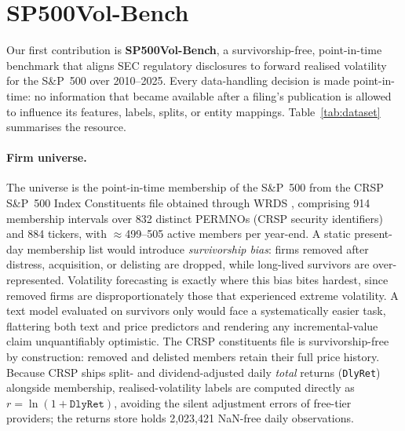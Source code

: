 \section{SP500Vol-Bench}
\label{sec:dataset}

Our first contribution is \textbf{SP500Vol-Bench}, a survivorship-free, point-in-time benchmark that aligns SEC regulatory disclosures to forward realised volatility for the S\&P~500 over 2010--2025. Every data-handling decision is made point-in-time: no information that became available after a filing's publication is allowed to influence its features, labels, splits, or entity mappings. Table~\ref{tab:dataset} summarises the resource.

\paragraph{Firm universe.}
The universe is the point-in-time membership of the S\&P~500 from the CRSP S\&P~500 Index Constituents file obtained through WRDS \citep{crsp2026data}, comprising 914 membership intervals over 832 distinct PERMNOs (CRSP security identifiers) and 884 tickers, with $\approx$499--505 active members per year-end. A static present-day membership list would introduce \emph{survivorship bias}: firms removed after distress, acquisition, or delisting are dropped, while long-lived survivors are over-represented. Volatility forecasting is exactly where this bias bites hardest, since removed firms are disproportionately those that experienced extreme volatility. A text model evaluated on survivors only would face a systematically easier task, flattering both text and price predictors and rendering any incremental-value claim unquantifiably optimistic. The CRSP constituents file is survivorship-free by construction: removed and delisted members retain their full price history. Because CRSP ships split- and dividend-adjusted daily \emph{total} returns (\texttt{DlyRet}) alongside membership, realised-volatility labels are computed directly as $r=\ln(1+\texttt{DlyRet})$, avoiding the silent adjustment errors of free-tier providers; the returns store holds 2{,}023{,}421 NaN-free daily observations.

